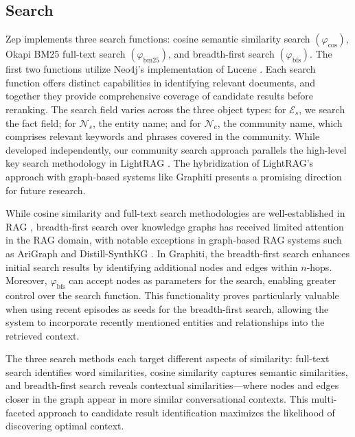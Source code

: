 \documentclass{article}
\begin{document}
\subsection{Search}
Zep implements three search functions: cosine semantic similarity search $(\varphi_\text{cos})$, Okapi BM25 full-text search $(\varphi_\text{bm25})$, and breadth-first search $(\varphi_\text{bfs})$. The first two functions utilize Neo4j's implementation of Lucene \cite{neo4j}\cite{lucene}. Each search function offers distinct capabilities in identifying relevant documents, and together they provide comprehensive coverage of candidate results before reranking. The search field varies across the three object types: for $\mathcal{E}_s$, we search the fact field; for $\mathcal{N}_s$, the entity name; and for $\mathcal{N}_c$, the community name, which comprises relevant keywords and phrases covered in the community. While developed independently, our community search approach parallels the high-level key search methodology in LightRAG \cite{lightrag}. The hybridization of LightRAG's approach with graph-based systems like Graphiti presents a promising direction for future research.

While cosine similarity and full-text search methodologies are well-established in RAG \cite{luceneisallyouneed}, breadth-first search over knowledge graphs has received limited attention in the RAG domain, with notable exceptions in graph-based RAG systems such as AriGraph \cite{arigraph} and Distill-SynthKG \cite{synthkg}. In Graphiti, the breadth-first search enhances initial search results by identifying additional nodes and edges within $n$-hops. Moreover, $\varphi_\text{bfs}$ can accept nodes as parameters for the search, enabling greater control over the search function. This functionality proves particularly valuable when using recent episodes as seeds for the breadth-first search, allowing the system to incorporate recently mentioned entities and relationships into the retrieved context.

The three search methods each target different aspects of similarity: full-text search identifies word similarities, cosine similarity captures semantic similarities, and breadth-first search reveals contextual similarities—where nodes and edges closer in the graph appear in more similar conversational contexts. This multi-faceted approach to candidate result identification maximizes the likelihood of discovering optimal context.
\end{document}
